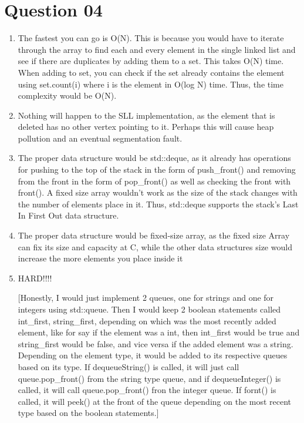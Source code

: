 \documentclass{article}
\begin{document}
\section{Question 04}
\begin{enumerate}[label=(\alph*)]

\item The fastest you can go is O(N). This is because you would have to iterate through the array to find each and every element in the single linked list and see if there are duplicates by adding them to a set. This takes O(N) time. When adding to set, you can check if the set already contains the element using set.count(i) where i is the element in O(log N) time. Thus, the time complexity would be O(N).

\item Nothing will happen to the SLL implementation, as the element that is deleted has no other vertex pointing to it. Perhaps this will cause heap pollution and an eventual segmentation fault. 

\item The proper data structure would be std::deque, as it already has operations for pushing to the top of the stack in the form of push\_front() and removing from the front in the form of pop\_front() as well as checking the front with front(). A fixed size array wouldn't work as the size of the stack changes with the number of elements place in it. Thus, std::deque supports the stack's Last In First Out data structure.

\item The proper data structure would be fixed-size array, as the fixed size Array can fix its size and capacity at C, while the other data structures size would increase the more elements you place inside it

\item HARD!!!!

[Honestly, I would just implement 2 queues, one for strings and one for integers using std::queue. Then I would keep 2 boolean statements called int\_first, string\_first, depending on which was the most recently added element, like for say if the element was a int, then int\_first would be true and string\_first would be false, and vice versa if the added element was a string. Depending on the element type, it would be added to its respective queues based on its type. If dequeueString() is called, it will just call queue.pop\_front() from the string type queue, and if dequeueInteger() is called, it will call queue.pop\_front() fron the integer queue. If fornt() is called, it will peek() at the front of the queue depending on the most recent type based on the boolean statements.]


\end{enumerate}
\end{document}
